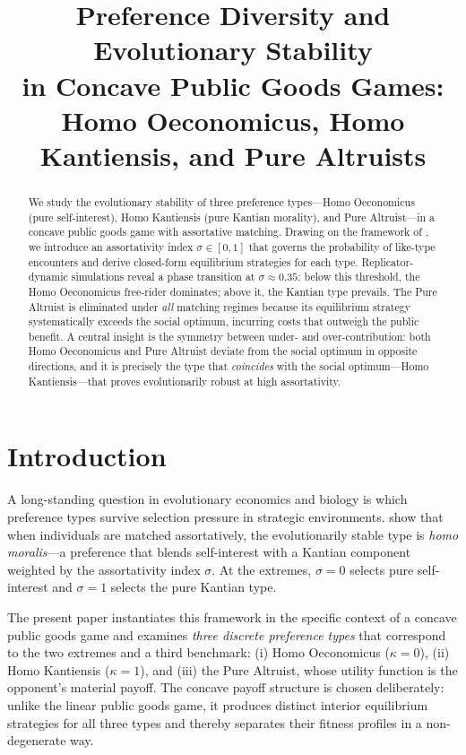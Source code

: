 \documentclass[12pt]{article}
\title{Preference Diversity and Evolutionary Stability\\
in Concave Public Goods Games:\\
Homo Oeconomicus, Homo Kantiensis, and Pure Altruists}
\author{}
\date{}
\begin{document}
\maketitle

\begin{abstract}
We study the evolutionary stability of three preference types---Homo Oeconomicus (pure self-interest), Homo Kantiensis (pure Kantian morality), and Pure Altruist---in a concave public goods game with assortative matching. Drawing on the framework of \citet{AlgerWeibull2013}, we introduce an assortativity index $\sigma \in [0,1]$ that governs the probability of like-type encounters and derive closed-form equilibrium strategies for each type. Replicator-dynamic simulations reveal a phase transition at $\sigma \approx 0.35$: below this threshold, the Homo Oeconomicus free-rider dominates; above it, the Kantian type prevails. The Pure Altruist is eliminated under \emph{all} matching regimes because its equilibrium strategy systematically exceeds the social optimum, incurring costs that outweigh the public benefit. A central insight is the symmetry between under- and over-contribution: both Homo Oeconomicus and Pure Altruist deviate from the social optimum in opposite directions, and it is precisely the type that \emph{coincides} with the social optimum---Homo Kantiensis---that proves evolutionarily robust at high assortativity.
\end{abstract}

\section{Introduction}

A long-standing question in evolutionary economics and biology is which preference types survive selection pressure in strategic environments. \citet{AlgerWeibull2013} show that when individuals are matched assortatively, the evolutionarily stable type is \emph{homo moralis}---a preference that blends self-interest with a Kantian component weighted by the assortativity index $\sigma$. At the extremes, $\sigma = 0$ selects pure self-interest and $\sigma = 1$ selects the pure Kantian type.

The present paper instantiates this framework in the specific context of a concave public goods game and examines \emph{three discrete preference types} that correspond to the two extremes and a third benchmark: (i) Homo Oeconomicus ($\kappa = 0$), (ii) Homo Kantiensis ($\kappa = 1$), and (iii) the Pure Altruist, whose utility function is the opponent's material payoff. The concave payoff structure is chosen deliberately: unlike the linear public goods game, it produces distinct interior equilibrium strategies for all three types and thereby separates their fitness profiles in a non-degenerate way.
\end{document}
